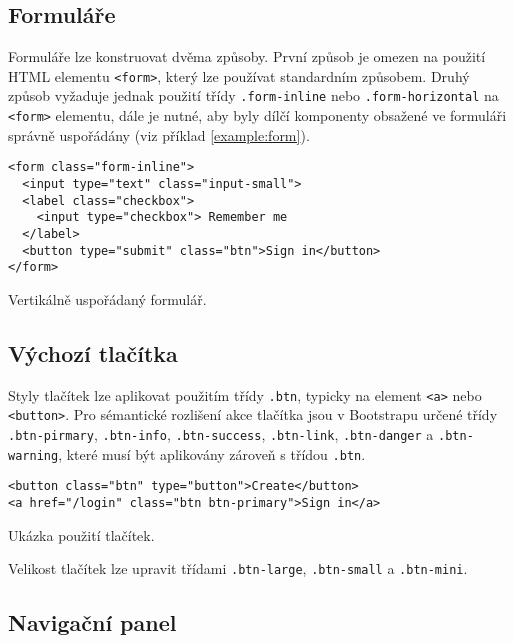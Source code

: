 \subsection{Formuláře}

Formuláře lze konstruovat dvěma způsoby. První způsob je omezen na použití HTML elementu \texttt{<form>}, který lze používat standardním způsobem. Druhý způsob vyžaduje jednak použití třídy \texttt{.form-inline} nebo \texttt{.form-horizontal} na \texttt{<form>} elementu, dále je nutné, aby byly dílčí komponenty obsažené ve formuláři správně uspořádány (viz příklad \ref{example:form}).

\begin{example}
    \centering
    \begin{lstlisting}
<form class="form-inline">
  <input type="text" class="input-small">
  <label class="checkbox">
    <input type="checkbox"> Remember me
  </label>
  <button type="submit" class="btn">Sign in</button>
</form>
    \end{lstlisting}
    \caption{Vertikálně uspořádaný formulář.}
    \label{example:form}
\end{example}

\subsection{Výchozí tlačítka}

Styly tlačítek lze aplikovat použitím třídy \texttt{.btn}, typicky na element \texttt{<a>} nebo \texttt{<button>}. Pro sémantické rozlišení akce tlačítka jsou v Bootstrapu určené třídy \texttt{.btn-pirmary}, \texttt{.btn-info}, \texttt{.btn-success}, \texttt{.btn-link}, \texttt{.btn-danger} a \texttt{.btn-warning}, které musí být aplikovány zároveň s třídou \texttt{.btn}.

\begin{example}
    \centering
    \begin{lstlisting}
<button class="btn" type="button">Create</button>
<a href="/login" class="btn btn-primary">Sign in</a>
    \end{lstlisting}
    \caption{Ukázka použití tlačítek.}
    \label{example:form}
\end{example}

Velikost tlačítek lze upravit třídami \texttt{.btn-large}, \texttt{.btn-small} a \texttt{.btn-mini}.

\subsection{Navigační panel}

